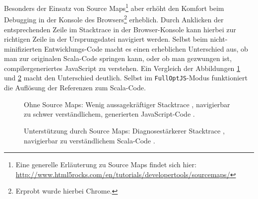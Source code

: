 \documentclass[a4paper, 12pt, hidelinks, listof=totoc, listoftables=totoc, bibliography=totoc]{scrreprt}
\newcommand{\code}[1]{\lstinline[language=Scala, style=inline]|#1|}
\begin{document}
Besonders der Einsatz von Source Maps\footnote{Eine generelle Erläuterung zu Source Maps findet sich hier: \url{http://www.html5rocks.com/en/tutorials/developertools/sourcemaps/}} aber erhöht den Komfort beim Debugging in der Konsole des Browsers\footnote{Erprobt wurde hierbei Chrome.} erheblich. Durch Anklicken der entsprechenden Zeile im Stacktrace in der Browser-Konsole kann hierbei zur richtigen Zeile in der Ursprungsdatei navigiert werden. Selbst beim nicht-minifizierten Entwicklungs-Code macht es einen erheblichen Unterschied aus, ob man zur originalen Scala-Code springen kann, oder ob man gezwungen ist, compilergeneriertes JavaScript zu verstehen. Ein Vergleich der Abbildungen \ref{fig:no-sourcemaps} und \ref{fig:sourcemaps} macht den Unterschied deutlich. Selbst im \code{FullOptJS}-Modus funktioniert die Auflösung der Referenzen zum Scala-Code.

\begin{figure}[!h]
	\centering
	\caption[Ohne Source Maps.]{Ohne Source Maps: Wenig aussagekräftiger Stacktrace \protect{}, navigierbar zu schwer verständlichem, generierten JavaScript-Code \protect{}.}
	\label{fig:no-sourcemaps}
\end{figure}

\begin{figure}[!h]
	\centering
	\caption[Unterstützung durch Source Maps.]{Unterstützung durch Source Maps: Diagnosestärkerer Stacktrace \protect{}, navigierbar zu verständlichem Scala-Code \protect{}.}
	\label{fig:sourcemaps}
\end{figure}
\end{document}
